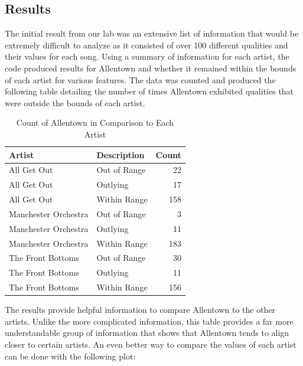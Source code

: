 \documentclass{article}\usepackage[]{graphicx}\usepackage[]{xcolor}
\begin{document}
\begin{multicols}{2}
\section{Results}
The initial result from our lab was an extensive list of information that would be extremely difficult to analyze as it consisted of over 100 different qualities and their values for each song. Using a summary of information for each artist, the code produced results for Allentown and whether it remained within the bounds of each artist for various features. The data was counted and produced the following table detailing the number of times Allentown exhibited qualities that were outside the bounds of each artist.




\begin{table}[H]
\centering
\begingroup\small
\begin{tabular}{llr}
  \hline
Artist & Description & Count \\ 
  \hline
All Get Out & Out of Range &  22 \\ 
  All Get Out & Outlying &  17 \\ 
  All Get Out & Within Range & 158 \\ 
  Manchester Orchestra & Out of Range &   3 \\ 
  Manchester Orchestra & Outlying &  11 \\ 
  Manchester Orchestra & Within Range & 183 \\ 
  The Front Bottoms & Out of Range &  30 \\ 
  The Front Bottoms & Outlying &  11 \\ 
  The Front Bottoms & Within Range & 156 \\ 
   \hline
\end{tabular}
\endgroup
\caption{Count of Allentown in Comparison to Each Artist} 
\label{count.tab}
\end{table}


The results provide helpful information to compare Allentown to the other artists. Unlike the more complicated information, this table provides a far more understandable group of information that shows that Allentown tends to align closer to certain artists. An even better way to compare the values of each artist can be done with the following plot:


\end{multicols}
\end{document}

